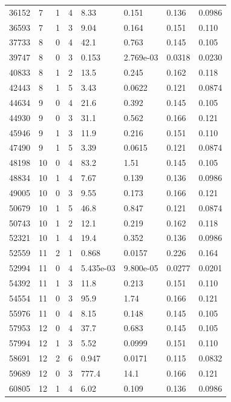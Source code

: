 \documentclass[preview]{standalone}
\begin{document}
{{{\begin{tabular}{L{1.2cm}C{1.2cm} C{0.3cm}C{0.5cm} C{1.4cm}C{1.4cm} C{1.4cm}C{1.4cm}}
  36152  &     7  & 1     &  4 &  8.33  & 0.151  & 0.136 &  0.0986   \\ 
  36593  &     7  & 1     &  3 &  9.04  & 0.164  & 0.151 &  0.110   \\ 
  37733  &     8  & 0     &  4 &  42.1  & 0.763  & 0.145 &  0.105   \\ 
  39747  &     8  & 0     &  3 &  0.153  & 2.769e-03  & 0.0318 &  0.0230   \\ 
  40833  &     8  & 1     &  2 &  13.5  & 0.245  & 0.162 &  0.118   \\ 
  42443  &     8  & 1     &  5 &  3.43  & 0.0622  & 0.121 &  0.0874   \\ 
  44634  &     9  & 0     &  4 &  21.6  & 0.392  & 0.145 &  0.105   \\ 
  44930  &     9  & 0     &  3 &  31.1  & 0.562  & 0.166 &  0.121   \\ 
  45946  &     9  & 1     &  3 &  11.9  & 0.216  & 0.151 &  0.110   \\ 
  47490  &     9  & 1     &  5 &  3.39  & 0.0615  & 0.121 &  0.0874   \\ 
  48198  &    10  & 0     &  4 &  83.2  & 1.51  & 0.145 &  0.105   \\ 
  48834  &    10  & 1     &  4 &  7.67  & 0.139  & 0.136 &  0.0986   \\ 
  49005  &    10  & 0     &  3 &  9.55  & 0.173  & 0.166 &  0.121   \\ 
  50679  &    10  & 1     &  5 &  46.8  & 0.847  & 0.121 &  0.0874   \\ 
  50743  &    10  & 1     &  2 &  12.1  & 0.219  & 0.162 &  0.118   \\ 
  52321  &    10  & 1     &  4 &  19.4  & 0.352  & 0.136 &  0.0986   \\ 
  52559  &    11  & 2     &  1 &  0.868  & 0.0157  & 0.226 &  0.164   \\ 
  52994  &    11  & 0     &  4 &  5.435e-03  & 9.800e-05  & 0.0277 &  0.0201   \\ 
  54392  &    11  & 1     &  3 &  11.8  & 0.213  & 0.151 &  0.110   \\ 
  54554  &    11  & 0     &  3 &  95.9  & 1.74  & 0.166 &  0.121   \\ 
  55976  &    11  & 0     &  4 &  8.15  & 0.148  & 0.145 &  0.105   \\ 
  57953  &    12  & 0     &  4 &  37.7  & 0.683  & 0.145 &  0.105   \\ 
  57994  &    12  & 1     &  3 &  5.52  & 0.0999  & 0.151 &  0.110   \\ 
  58691  &    12  & 2     &  6 &  0.947  & 0.0171  & 0.115 &  0.0832   \\ 
  59689  &    12  & 0     &  3 &  777.4  & 14.1  & 0.166 &  0.121   \\ 
  60805  &    12  & 1     &  4 &  6.02  & 0.109  & 0.136 &  0.0986   \\ 
\hline 
\end{tabular} 

}}}
\end{document}
